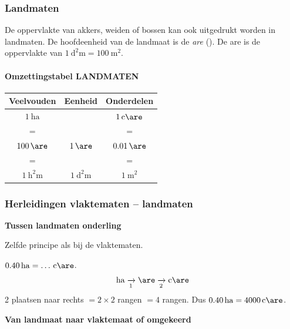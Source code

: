 \documentclass{bis}
\begin{document}
\subsubsection{Landmaten}
De oppervlakte van akkers, weiden of bossen kan ook uitgedrukt worden in landmaten. De hoofdeenheid van de landmaat is de \emph{are} (\si{\are}). De are is de oppervlakte van \(\SI{1}{\square\deca\metre}=\SI{100}{\square\metre}\).

\paragraph{Omzettingstabel LANDMATEN}
\begin{center}
\renewcommand{\arraystretch}{1.2}\setlength{\tabcolsep}{4pt}%
\begin{tabular}{*{3}{c}}
  \textbf{Veelvouden} & \textbf{Eenheid} & \textbf{Onderdelen} \\
  \midrule
  \(\SI{1}{\hectare}\)                &                  & \(\SI{1}{\centi\are}\)                \\
  =                   &                  & =                   \\
  \(\SI{100}{\are}\)               & \textbf{\(\SI{1}{\are}\)}     & \(\SI{0.01}{\are}\)              \\
  =                   &                  & =                   \\
  \(\SI{1}{\square\hecto\metre}\)            & \(\SI{1}{\square\deca\metre}\)          & \(\SI{1}{\square\metre}\)
\end{tabular}
\end{center}

\subsubsection{Herleidingen vlaktematen -- landmaten}

\textbf{Tussen landmaten onderling}

Zelfde principe als bij de vlaktematen.

\begin{voorbeeld}
\(\SI{0.40}{\hectare}=\ldots\,\si{\centi\are}\).
\[
\si{\hectare} \xrightarrow[1]{} \si{\are} \xrightarrow[2]{} \si{\centi\are}
\]
2 plaatsen naar rechts \(=2\times2\) rangen \(=4\) rangen. Dus \(\SI{0.40}{\hectare}=\SI{4000}{\centi\are}\).
\end{voorbeeld}

\textbf{Van landmaat naar vlaktemaat of omgekeerd}
\end{document}
